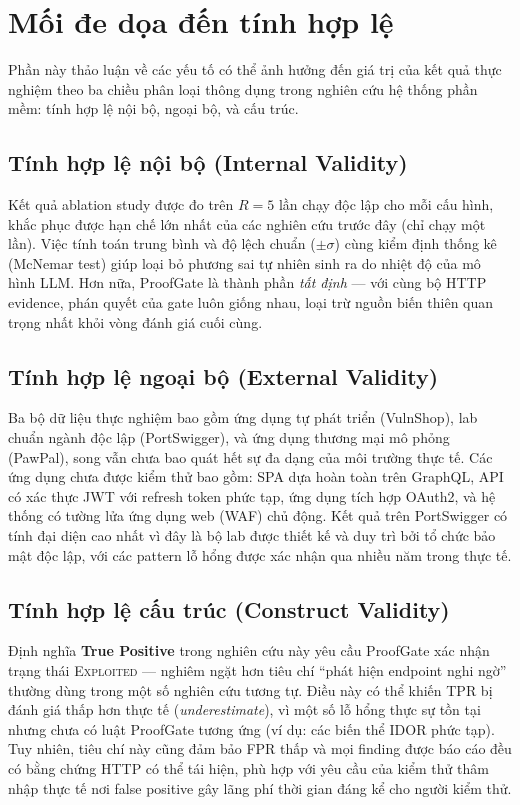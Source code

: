 \section{Mối đe dọa đến tính hợp lệ}
\label{sec:threats}

Phần này thảo luận về các yếu tố có thể ảnh hưởng đến giá trị của kết quả thực nghiệm theo ba chiều phân loại thông dụng trong nghiên cứu hệ thống phần mềm: tính hợp lệ nội bộ, ngoại bộ, và cấu trúc.

\subsection{Tính hợp lệ nội bộ (Internal Validity)}

Kết quả ablation study được đo trên $R=5$ lần chạy độc lập cho mỗi cấu hình, khắc phục được hạn chế lớn nhất của các nghiên cứu trước đây (chỉ chạy một lần). Việc tính toán trung bình và độ lệch chuẩn ($\pm \sigma$) cùng kiểm định thống kê (McNemar test) giúp loại bỏ phương sai tự nhiên sinh ra do nhiệt độ của mô hình LLM. Hơn nữa, ProofGate là thành phần \textit{tất định} --- với cùng bộ HTTP evidence, phán quyết của gate luôn giống nhau, loại trừ nguồn biến thiên quan trọng nhất khỏi vòng đánh giá cuối cùng.


\subsection{Tính hợp lệ ngoại bộ (External Validity)}

Ba bộ dữ liệu thực nghiệm bao gồm ứng dụng tự phát triển (VulnShop), lab chuẩn ngành độc lập (PortSwigger), và ứng dụng thương mại mô phỏng (PawPal), song vẫn chưa bao quát hết sự đa dạng của môi trường thực tế. Các ứng dụng chưa được kiểm thử bao gồm: SPA dựa hoàn toàn trên GraphQL, API có xác thực JWT với refresh token phức tạp, ứng dụng tích hợp OAuth2, và hệ thống có tường lửa ứng dụng web (WAF) chủ động. Kết quả trên PortSwigger có tính đại diện cao nhất vì đây là bộ lab được thiết kế và duy trì bởi tổ chức bảo mật độc lập, với các pattern lỗ hổng được xác nhận qua nhiều năm trong thực tế.

\subsection{Tính hợp lệ cấu trúc (Construct Validity)}

Định nghĩa \textbf{True Positive} trong nghiên cứu này yêu cầu ProofGate xác nhận trạng thái \textsc{Exploited} --- nghiêm ngặt hơn tiêu chí ``phát hiện endpoint nghi ngờ'' thường dùng trong một số nghiên cứu tương tự. Điều này có thể khiến TPR bị đánh giá thấp hơn thực tế (\textit{underestimate}), vì một số lỗ hổng thực sự tồn tại nhưng chưa có luật ProofGate tương ứng (ví dụ: các biến thể IDOR phức tạp). Tuy nhiên, tiêu chí này cũng đảm bảo FPR thấp và mọi finding được báo cáo đều có bằng chứng HTTP có thể tái hiện, phù hợp với yêu cầu của kiểm thử thâm nhập thực tế nơi false positive gây lãng phí thời gian đáng kể cho người kiểm thử.


